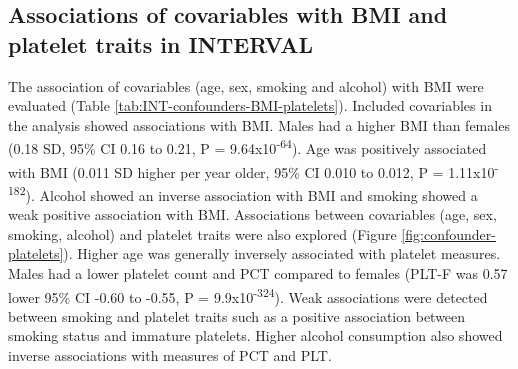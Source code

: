 \documentclass[11pt,twoside]{bristolthesis}
\begin{document}
\hypertarget{associations-of-covariables-with-bmi-and-platelet-traits-in-interval}{%
\subsection{Associations of covariables with BMI and platelet traits in INTERVAL}\label{associations-of-covariables-with-bmi-and-platelet-traits-in-interval}}

The association of covariables (age, sex, smoking and alcohol) with BMI were evaluated (Table \ref{tab:INT-confounders-BMI-platelets}). Included covariables in the analysis showed associations with BMI. Males had a higher BMI than females (0.18 SD, 95\% CI 0.16 to 0.21, P = 9.64x10\textsuperscript{-64}). Age was positively associated with BMI (0.011 SD higher per year older, 95\% CI 0.010 to 0.012, P = 1.11x10\textsuperscript{-182}). Alcohol showed an inverse association with BMI and smoking showed a weak positive association with BMI. Associations between covariables (age, sex, smoking, alcohol) and platelet traits were also explored (Figure \ref{fig:confounder-platelets}). Higher age was generally inversely associated with platelet measures. Males had a lower platelet count and PCT compared to females (PLT-F was 0.57 lower 95\% CI -0.60 to -0.55, P = 9.9x10\textsuperscript{-324}). Weak associations were detected between smoking and platelet traits such as a positive association between smoking status and immature platelets. Higher alcohol consumption also showed inverse associations with measures of PCT and PLT.
\end{document}

